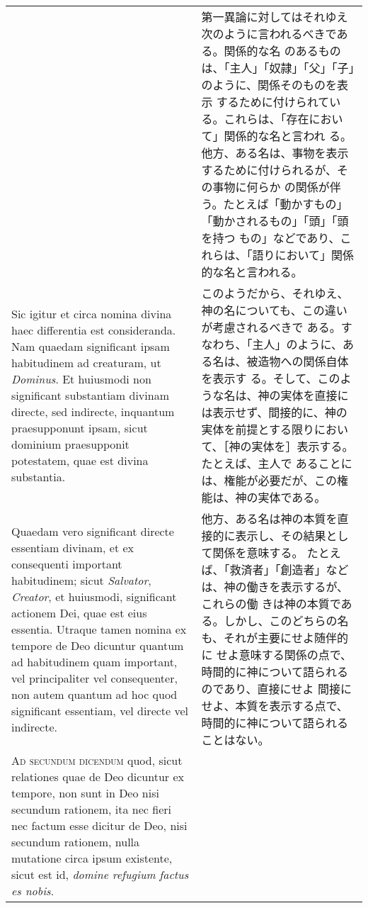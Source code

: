 \documentclass[10pt]{jsarticle} %
\begin{document}
\begin{longtable}{p{21em}p{21em}}
&

第一異論に対してはそれゆえ次のように言われるべきである。関係的な名
のあるものは、「主人」「奴隷」「父」「子」のように、関係そのものを表示
するために付けられている。これらは、「存在において」関係的な名と言われ
る。他方、ある名は、事物を表示するために付けられるが、その事物に何らか
の関係が伴う。たとえば「動かすもの」「動かされるもの」「頭」「頭を持つ
もの」などであり、これらは、「語りにおいて」関係的な名と言われる。

\\

Sic igitur et circa nomina divina
haec differentia est consideranda. Nam quaedam significant ipsam
habitudinem ad creaturam, ut {\itshape Dominus}. Et huiusmodi non
significant substantiam divinam directe, sed indirecte, inquantum
praesupponunt ipsam, sicut dominium praesupponit potestatem, quae est
divina substantia. 

&


このようだから、それゆえ、神の名についても、この違いが考慮されるべきで
ある。すなわち、「主人」のように、ある名は、被造物への関係自体を表示す
る。そして、このような名は、神の実体を直接には表示せず、間接的に、神の
実体を前提とする限りにおいて、［神の実体を］表示する。たとえば、主人で
あることには、権能が必要だが、この権能は、神の実体である。


\\


Quaedam vero significant directe essentiam divinam,
et ex consequenti important habitudinem; sicut {\itshape Salvator},
{\itshape Creator}, et huiusmodi, significant actionem Dei, quae est
eius essentia. Utraque tamen nomina ex tempore de Deo dicuntur quantum
ad habitudinem quam important, vel principaliter vel consequenter, non
autem quantum ad hoc quod significant essentiam, vel directe vel
indirecte.


&

他方、ある名は神の本質を直接的に表示し、その結果として関係を意味する。
たとえば、「救済者」「創造者」などは、神の働きを表示するが、これらの働
きは神の本質である。しかし、このどちらの名も、それが主要にせよ随伴的に
せよ意味する関係の点で、時間的に神について語られるのであり、直接にせよ
間接にせよ、本質を表示する点で、時間的に神について語られることはない。

\\



{\scshape Ad secundum dicendum} quod, sicut relationes quae de Deo
dicuntur ex tempore, non sunt in Deo nisi secundum rationem, ita nec
fieri nec factum esse dicitur de Deo, nisi secundum rationem, nulla
mutatione circa ipsum existente, sicut est id, {\itshape domine
refugium factus es nobis}.



\end{longtable}
\end{document}
